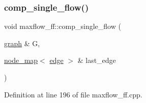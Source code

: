 \subsubsection{\texorpdfstring{comp\+\_\+single\+\_\+flow()}{comp\_single\_flow()}}
{\footnotesize\ttfamily void maxflow\+\_\+ff\+::comp\+\_\+single\+\_\+flow (\begin{DoxyParamCaption}\item[{\mbox{\hyperlink{classgraph}{graph}} \&}]{G,  }\item[{\mbox{\hyperlink{classnode__map}{node\+\_\+map}}$<$ \mbox{\hyperlink{classedge}{edge}} $>$ \&}]{last\+\_\+edge }\end{DoxyParamCaption})\hspace{0.3cm}{\ttfamily [protected]}}



Definition at line 196 of file maxflow\+\_\+ff.\+cpp.



